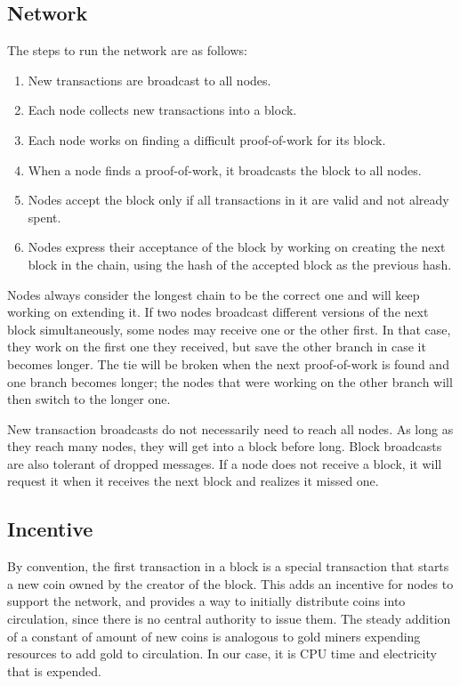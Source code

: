 \subsection{Network}\label{network}

The steps to run the network are as follows:

\begin{enumerate}
\def\labelenumi{\arabic{enumi}.}
\tightlist
\item
  New transactions are broadcast to all nodes.
\item
  Each node collects new transactions into a block.
\item
  Each node works on finding a difficult proof-of-work for its block.
\item
  When a node finds a proof-of-work, it broadcasts the block to all
  nodes.
\item
  Nodes accept the block only if all transactions in it are valid and
  not already spent.
\item
  Nodes express their acceptance of the block by working on creating the
  next block in the chain, using the hash of the accepted block as the
  previous hash.
\end{enumerate}

Nodes always consider the longest chain to be the correct one and will
keep working on extending it. If two nodes broadcast different versions
of the next block simultaneously, some nodes may receive one or the
other first. In that case, they work on the first one they received, but
save the other branch in case it becomes longer. The tie will be broken
when the next proof-of-work is found and one branch becomes longer; the
nodes that were working on the other branch will then switch to the
longer one.

New transaction broadcasts do not necessarily need to reach all nodes.
As long as they reach many nodes, they will get into a block before
long. Block broadcasts are also tolerant of dropped messages. If a node
does not receive a block, it will request it when it receives the next
block and realizes it missed one.

\subsection{Incentive}\label{incentive}

By convention, the first transaction in a block is a special transaction
that starts a new coin owned by the creator of the block. This adds an
incentive for nodes to support the network, and provides a way to
initially distribute coins into circulation, since there is no central
authority to issue them. The steady addition of a constant of amount of
new coins is analogous to gold miners expending resources to add gold to
circulation. In our case, it is CPU time and electricity that is
expended.

